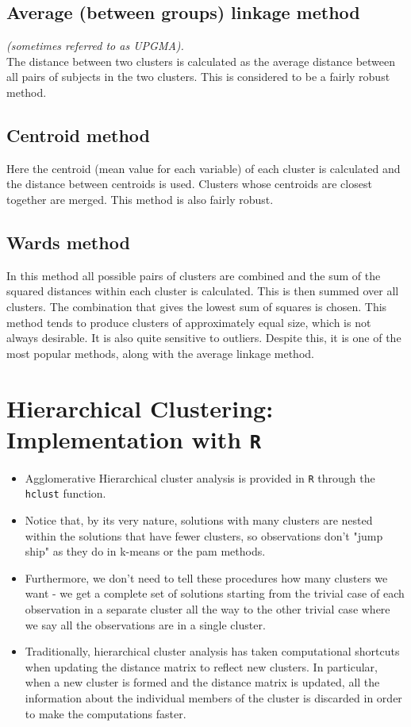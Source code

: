 \documentclass[SKLCluster.tex]{subfiles}
\begin{document}
\subsection{Average (between groups) linkage method }
\textit{(sometimes referred to as UPGMA).}\\
The distance between two clusters is calculated as the average distance between all pairs
of subjects in the two clusters. This is considered to be a fairly robust method.

\subsection{Centroid method}
Here the centroid (mean value for each variable) of each cluster is calculated and the
distance between centroids is used. Clusters whose centroids are closest together are
merged. This method is also fairly robust.

\subsection{Wards method}
In this method all possible pairs of clusters are combined and the sum of the squared
distances within each cluster is calculated. This is then summed over all clusters. The
combination that gives the lowest sum of squares is chosen. This method tends to
produce clusters of approximately equal size, which is not always desirable. It is also
quite sensitive to outliers. Despite this, it is one of the most popular methods, along
with the average linkage method.

\section{Hierarchical Clustering: Implementation with \texttt{R}}
\begin{itemize}
\item Agglomerative Hierarchical cluster analysis is provided in \texttt{R} through the \texttt{hclust} function.
\item Notice that, by its very nature, solutions with many clusters are nested within the solutions that have fewer clusters, so observations don't "jump ship" as they do in k-means or the pam methods. 
\item Furthermore, we don't need to tell these procedures how many clusters we want - we get a complete set of solutions starting from the trivial case of each observation in a separate cluster all the way to the other trivial case where we say all the observations are in a single cluster.
\item Traditionally, hierarchical cluster analysis has taken computational shortcuts when updating the distance matrix to reflect new clusters. In particular, when a new cluster is formed and the distance matrix is updated, all the information about the individual members of the cluster is discarded in order to make the computations faster. 
\end{itemize}
\end{document}
